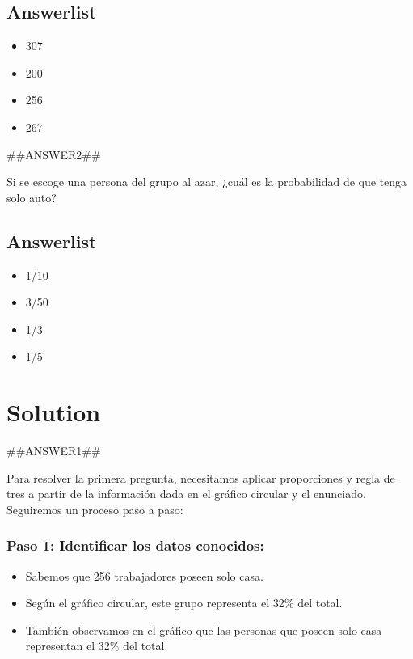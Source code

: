 \documentclass[
]{article}
\providecommand{\tightlist}{%
  \setlength{\itemsep}{0pt}\setlength{\parskip}{0pt}}
\begin{document}
\subsection{Answerlist}\label{answerlist}

\begin{itemize}
\tightlist
\item
  307
\item
  200
\item
  256
\item
  267
\end{itemize}

\#\#ANSWER2\#\#

Si se escoge una persona del grupo al azar, ¿cuál es la probabilidad de
que tenga solo auto?

\subsection{Answerlist}\label{answerlist-1}

\begin{itemize}
\tightlist
\item
  1/10
\item
  3/50
\item
  1/3
\item
  1/5
\end{itemize}

\section{Solution}\label{solution}

\#\#ANSWER1\#\#

Para resolver la primera pregunta, necesitamos aplicar proporciones y
regla de tres a partir de la información dada en el gráfico circular y
el enunciado. Seguiremos un proceso paso a paso:

\subsubsection{Paso 1: Identificar los datos
conocidos:}\label{paso-1-identificar-los-datos-conocidos}

\begin{itemize}
\tightlist
\item
  Sabemos que 256 trabajadores poseen solo casa.
\item
  Según el gráfico circular, este grupo representa el 32\% del total.
\item
  También observamos en el gráfico que las personas que poseen solo casa
  representan el 32\% del total.
\end{itemize}
\end{document}
